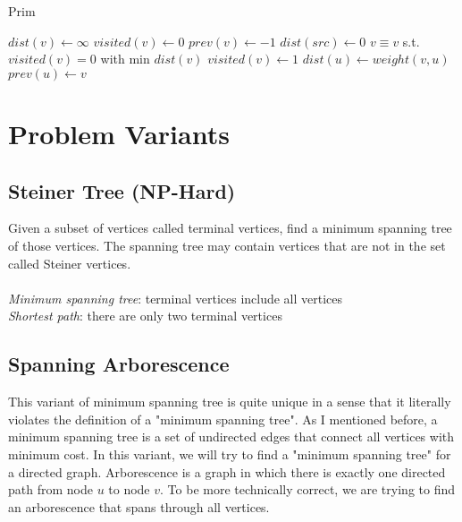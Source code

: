 \documentclass[11pt]{article}
\begin{document}
\begin{algorithm}[H]
\caption{Prim}
\begin{algorithmic}
	\State $dist(v) \gets \infty$
	\State $visited(v) \gets 0$
    \State $prev(v) \gets -1$
\EndFor
\State $dist(src) \gets 0$
	\State $v \equiv v$ s.t. $visited(v)=0$ with min $dist(v)$
    \State $visited(v) \gets 1$
				\State $dist(u) \gets weight(v, u)$
   	        	\State $prev(u) \gets v$
			\EndIf
        \EndIf
    \EndFor
\EndWhile
\end{algorithmic}
\end{algorithm}


\section{Problem Variants}

\subsection{Steiner Tree (NP-Hard)}

Given a subset of vertices called terminal vertices, find a minimum spanning tree of those vertices. The spanning tree may contain vertices that are not in the set called Steiner vertices. \\
\\
\textit{Minimum spanning tree}: terminal vertices include all vertices \\
\textit{Shortest path}: there are only two terminal vertices 

\subsection{Spanning Arborescence}

This variant of minimum spanning tree is quite unique in a sense that it literally violates the definition of a "minimum spanning tree". As I mentioned before, a minimum spanning tree is a set of undirected edges that connect all vertices with minimum cost. In this variant, we will try to find a "minimum spanning tree" for a directed graph. Arborescence is a graph in which there is exactly one directed path from node $u$ to node $v$. To be more technically correct, we are trying to find an arborescence that spans through all vertices. 
\end{document}
